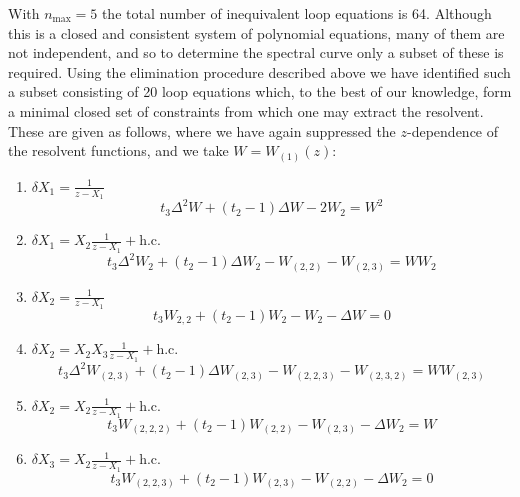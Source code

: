 With $n_{\text{max}}=5$ the total number of inequivalent loop equations is 64. Although this is a
closed and consistent system of polynomial equations, many of them are not independent, and so to
determine the spectral curve only a subset of these is required. Using the elimination procedure
described above we have identified such a subset consisting of 20 loop equations which, to the best
of our knowledge, form a minimal closed set of constraints from which one may extract the
resolvent. These are given as follows, where we have again suppressed the $z$-dependence of the
resolvent functions, and we take $W=W_{(1)}(z)$:
%
\begin{enumerate}
    \item $\delta X_1 = \frac{1}{z-X_1}$
          \begin{equation}
              \label{1}
              t_3 \Delta^2 W +(t_2-1)\Delta W - 2 W_{2} = W^2
          \end{equation}
    \item $\delta X_1 = X_2 \frac{1}{z-X_1} + \text{h.c.}$
          \begin{equation}
              \label{2}
              t_3 \Delta^2 W_2 +(t_2-1)\Delta W_{2} - W_{(2,2)} - W_{(2,3)} = W W_{2}
          \end{equation}
    \item $\delta X_2 = \frac{1}{z-X_1}$
          \begin{equation}
              \label{3}
              t_3 W_{2,2} + (t_2-1)W_{2} - W_2 - \Delta W = 0
          \end{equation}
    \item $\delta X_2 = X_2 X_3 \frac{1}{z-X_1} + \text{h.c.}$
          \begin{equation}
              \label{4}
              t_3 \Delta^2 W_{(2,3)} + (t_2-1)\Delta W_{(2,3)} - W_{(2,2,3)} - W_{(2,3,2)} = W W_{(2,3)}
          \end{equation}
    \item $\delta X_2 = X_2 \frac{1}{z-X_1} + \text{h.c.}$
          \begin{equation}
              \label{5}
              t_3 W_{(2,2,2)} + (t_2-1)W_{(2,2)} - W_{(2,3)} - \Delta W_{2} = W
          \end{equation}
    \item $\delta X_3 = X_2 \frac{1}{z-X_1} + \text{h.c.}$
          \begin{equation}
              \label{6}
              t_3 W_{(2,2,3)} + (t_2-1)W_{(2,3)} - W_{(2,2)} - \Delta W_{2} = 0
          \end{equation}

\end{enumerate}
